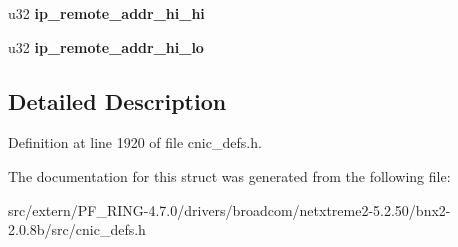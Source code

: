 \begin{DoxyCompactItemize}
\item 
\hypertarget{structxstorm__ip__v6__context__section_a57a78ca5dd22d1d555886c35d783d0f8}{
u32 {\bfseries ip\_\-remote\_\-addr\_\-hi\_\-hi}}
\label{structxstorm__ip__v6__context__section_a57a78ca5dd22d1d555886c35d783d0f8}

\item 
\hypertarget{structxstorm__ip__v6__context__section_a6ad60bf71dd6e6243270c1eb55903933}{
u32 {\bfseries ip\_\-remote\_\-addr\_\-hi\_\-lo}}
\label{structxstorm__ip__v6__context__section_a6ad60bf71dd6e6243270c1eb55903933}

\end{DoxyCompactItemize}


\subsection{Detailed Description}


Definition at line 1920 of file cnic\_\-defs.h.



The documentation for this struct was generated from the following file:\begin{DoxyCompactItemize}
\item 
src/extern/PF\_\-RING-\/4.7.0/drivers/broadcom/netxtreme2-\/5.2.50/bnx2-\/2.0.8b/src/cnic\_\-defs.h\end{DoxyCompactItemize}
